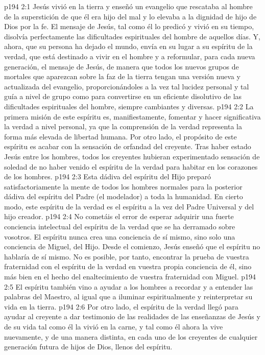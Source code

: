 \vs p194 2:1 Jesús vivió en la tierra y enseñó un evangelio que rescataba al hombre de la superstición de que él era hijo del mal y lo elevaba a la dignidad de hijo de Dios por la fe. El mensaje de Jesús, tal como él lo predicó y vivió en su tiempo, disolvía perfectamente las dificultades espirituales del hombre de aquellos días. Y, ahora, que su persona ha dejado el mundo, envía en su lugar a su espíritu de la verdad, que está destinado a vivir en el hombre y a reformular, para cada nueva generación, el mensaje de Jesús, de manera que todos los nuevos grupos de mortales que aparezcan sobre la faz de la tierra tengan una versión nueva y actualizada del evangelio, proporcionándoles a la vez tal lucidez personal y tal guía a nivel de grupo como para convertirse en un eficiente disolutivo de las dificultades espirituales del hombre, siempre cambiantes y diversas.
\vs p194 2:2 \pc La primera misión de este espíritu es, manifiestamente, fomentar y hacer significativa la verdad a nivel personal, ya que la comprensión de la verdad representa la forma más elevada de libertad humana. Por otro lado, el propósito de este espíritu es acabar con la sensación de orfandad del creyente. Tras haber estado Jesús entre los hombres, todos los creyentes hubieran experimentado sensación de soledad de no haber venido el espíritu de la verdad para habitar en los corazones de los hombres.
\vs p194 2:3 Esta dádiva del espíritu del Hijo preparó satisfactoriamente la mente de todos los hombres normales para la posterior dádiva del espíritu del Padre (el modelador) a toda la humanidad. En cierto modo, este espíritu de la verdad es el espíritu a la vez del Padre Universal y del hijo creador.
\vs p194 2:4 No cometáis el error de esperar adquirir una fuerte conciencia intelectual del espíritu de la verdad que se ha derramado sobre vosotros. El espíritu nunca crea una conciencia de sí mismo, sino solo una conciencia de Miguel, del Hijo. Desde el comienzo, Jesús enseñó que el espíritu no hablaría de sí mismo. No es posible, por tanto, encontrar la prueba de vuestra fraternidad con el espíritu de la verdad en vuestra propia conciencia de él, sino más bien en el hecho del enaltecimiento de vuestra fraternidad con Miguel.
\vs p194 2:5 El espíritu también vino a ayudar a los hombres a recordar y a entender las palabras del Maestro, al igual que a iluminar espiritualmente y reinterpretar su vida en la tierra.
\vs p194 2:6 Por otro lado, el espíritu de la verdad llegó para ayudar al creyente a dar testimonio de las realidades de las enseñanzas de Jesús y de su vida tal como él la vivió en la carne, y tal como él ahora la vive nuevamente, y de una manera distinta, en cada uno de los creyentes de cualquier generación futura de hijos de Dios, llenos del espíritu.
